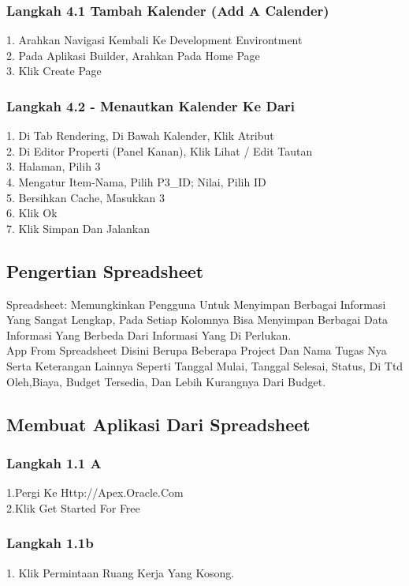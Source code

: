 \documentclass{article}
\begin{document}
{\subsubsection{Langkah 4.1 Tambah Kalender (Add A Calender)}
1.	Arahkan Navigasi Kembali Ke Development Environtment\\
2.	Pada Aplikasi Builder, Arahkan Pada Home Page\\
3.	Klik Create Page
\subsubsection{Langkah 4.2 - Menautkan Kalender Ke Dari}
1.	Di Tab Rendering, Di Bawah Kalender, Klik Atribut\\
2.	Di Editor Properti (Panel Kanan), Klik Lihat / Edit Tautan\\
3.	Halaman, Pilih 3\\
4.	Mengatur Item-Nama, Pilih P3_ID; Nilai, Pilih ID\\
5.	Bersihkan Cache, Masukkan 3\\
6.	Klik Ok\\
7.	Klik Simpan Dan Jalankan\\
\subsection{Pengertian Spreadsheet}
Spreadsheet: Memungkinkan Pengguna Untuk Menyimpan Berbagai Informasi Yang Sangat Lengkap, Pada Setiap Kolomnya Bisa Menyimpan Berbagai Data Informasi Yang Berbeda Dari Informasi Yang Di Perlukan.\\

App From Spreadsheet Disini Berupa Beberapa Project Dan Nama Tugas Nya Serta Keterangan Lainnya Seperti Tanggal Mulai, Tanggal Selesai, Status, Di Ttd Oleh,Biaya, Budget Tersedia, Dan Lebih Kurangnya Dari Budget.
\subsection{Membuat Aplikasi Dari Spreadsheet}
\subsubsection{Langkah 1.1 A}
1.Pergi Ke Http://Apex.Oracle.Com\\
2.Klik Get Started For Free

\subsubsection{Langkah 1.1b}
1.	Klik Permintaan Ruang Kerja Yang Kosong.\\

}
\end{document}
